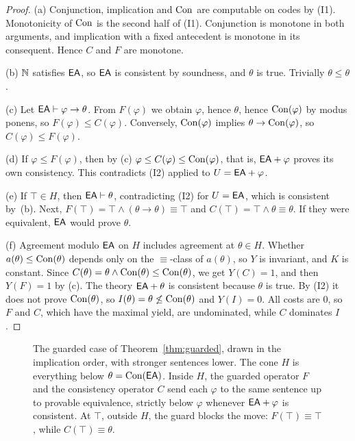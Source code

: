 \begin{proof}
(a) Conjunction, implication and $\mathrm{Con}$ are computable on codes by (I1). Monotonicity of $\mathrm{Con}$ is the second half of (I1). Conjunction is monotone in both arguments, and implication with a fixed antecedent is monotone in its consequent. Hence $C$ and $F$ are monotone.

(b) $\mathbb{N}$ satisfies $\mathsf{EA}$, so $\mathsf{EA}$ is consistent by soundness, and $\theta$ is true. Trivially $\theta\le\theta$.

(c) Let $\mathsf{EA}\vdash\varphi\to\theta$. From $F(\varphi)$ we obtain $\varphi$, hence $\theta$, hence $\mathrm{Con}(\varphi)$ by modus ponens, so $F(\varphi)\le C(\varphi)$. Conversely, $\mathrm{Con}(\varphi)$ implies $\theta\to\mathrm{Con}(\varphi)$, so $C(\varphi)\le F(\varphi)$.

(d) If $\varphi\le F(\varphi)$, then by (c) $\varphi\le C(\varphi)\le\mathrm{Con}(\varphi)$, that is, $\mathsf{EA}+\varphi$ proves its own consistency. This contradicts (I2) applied to $U=\mathsf{EA}+\varphi$.

(e) If $\top\in H$, then $\mathsf{EA}\vdash\theta$, contradicting (I2) for $U=\mathsf{EA}$, which is consistent by~(b). Next, $F(\top)=\top\wedge(\theta\to\theta)\equiv\top$ and $C(\top)=\top\wedge\theta\equiv\theta$. If they were equivalent, $\mathsf{EA}$ would prove $\theta$.

(f) Agreement modulo $\mathsf{EA}$ on $H$ includes agreement at $\theta\in H$. Whether $a(\theta)\le\mathrm{Con}(\theta)$ depends only on the $\equiv$-class of $a(\theta)$, so $Y$ is invariant, and $K$ is constant. Since $C(\theta)=\theta\wedge\mathrm{Con}(\theta)\le\mathrm{Con}(\theta)$, we get $Y(C)=1$, and then $Y(F)=1$ by (c). The theory $\mathsf{EA}+\theta$ is consistent because $\theta$ is true. By (I2) it does not prove $\mathrm{Con}(\theta)$, so $I(\theta)=\theta\not\le\mathrm{Con}(\theta)$ and $Y(I)=0$. All costs are $0$, so $F$ and $C$, which have the maximal yield, are undominated, while $C$ dominates $I$.
\end{proof}

\begin{figure}[t]
\centering

\caption{The guarded case of Theorem~\ref{thm:guarded}, drawn in the implication order, with stronger sentences lower. The cone $H$ is everything below $\theta=\mathrm{Con}(\mathsf{EA})$. Inside $H$, the guarded operator $F$ and the consistency operator $C$ send each $\varphi$ to the same sentence up to provable equivalence, strictly below $\varphi$ whenever $\mathsf{EA}+\varphi$ is consistent. At $\top$, outside $H$, the guard blocks the move: $F(\top)\equiv\top$, while $C(\top)\equiv\theta$.}
\label{fig:cone}
\end{figure}

